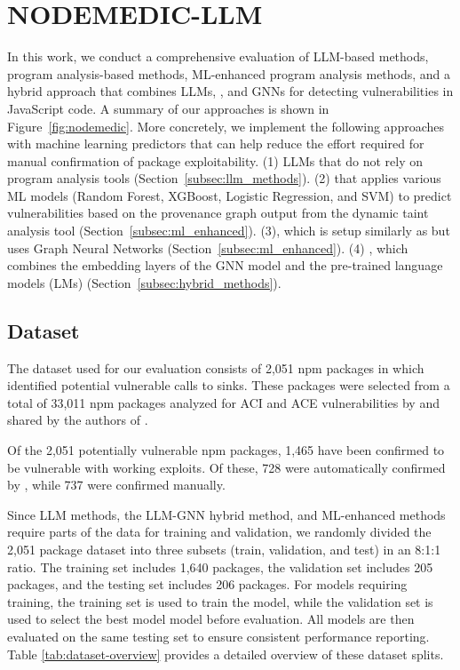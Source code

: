 \documentclass[12pt,openany,oneside,table]{cmuthesis}
\begin{document}
\section{NODEMEDIC-LLM}
In this work, we conduct a comprehensive evaluation of LLM-based methods, program analysis-based methods, ML-enhanced program analysis methods, and a hybrid approach that combines LLMs, \nodemedicfine, and GNNs for detecting vulnerabilities in JavaScript code.
A summary of our approaches is shown in Figure~\ref{fig:nodemedic}.
More concretely, we implement the following approaches with machine learning predictors that can help reduce the effort required for manual confirmation of package exploitability. (1) LLMs that do not rely on program analysis tools (Section~\ref{subsec:llm_methods}). (2)  that applies various ML models (Random Forest, XGBoost, Logistic Regression, and SVM) to predict vulnerabilities based on the provenance graph output from the dynamic taint analysis tool \nodemedicfine (Section~\ref{subsec:ml_enhanced}). 
(3), which is setup similarly as  but uses Graph Neural Networks (Section~\ref{subsec:ml_enhanced}). 
(4) , which combines the embedding layers of the GNN model and the pre-trained language models (LMs) (Section~\ref{subsec:hybrid_methods}).


\subsection{Dataset}\label{subsec:datasets}
The dataset used for our evaluation consists of 2,051 npm packages in which \nodemedicfine identified potential vulnerable calls to sinks. These packages were selected from a total of 33,011 npm packages analyzed for ACI and ACE vulnerabilities by \nodemedicfine and shared by the authors of \nodemedicfine.

Of the 2,051 potentially vulnerable npm packages, 1,465 have been confirmed to be vulnerable with working exploits. Of these, 728 were automatically confirmed by \nodemedicfine, while 737 were confirmed manually. 

Since LLM methods, the LLM-GNN hybrid method, and ML-enhanced \nodemedicfine methods require parts of the data for training and validation, we randomly divided the 2,051 package dataset into three subsets (train, validation, and test) in an 8:1:1 ratio. The training set includes 1,640 packages, the validation set includes 205 packages, and the testing set includes 206 packages.
For models requiring training, the training set is used to train the model, while the validation set is used to select the best model model before evaluation. All models are then evaluated on the same testing set to ensure consistent performance reporting.
Table \ref{tab:dataset-overview} provides a detailed overview of these dataset splits.
\end{document}
